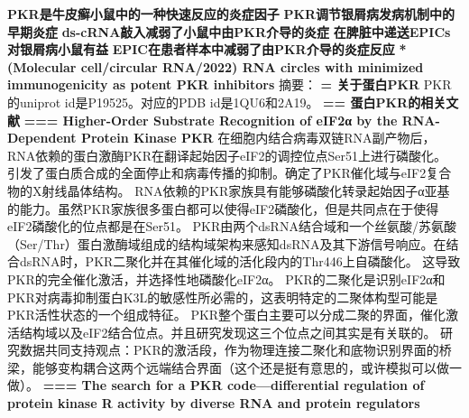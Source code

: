 \newline \textbf{PKR是牛皮癣小鼠中的一种快速反应的炎症因子}
\newline \indent 
\newline \textbf{PKR调节银屑病发病机制中的早期炎症}
\newline \indent
\newline \textbf{ds-cRNA敲入减弱了小鼠中由PKR介导的炎症}
\newline \indent
\newline \textbf{在脾脏中递送EPICs对银屑病小鼠有益}
\newline \indent
\newline \textbf{EPIC在患者样本中减弱了由PKR介导的炎症反应}
\newline \indent
\newline \textbf{* (Molecular cell/circular RNA/2022) RNA circles with minimized immunogenicity as potent PKR inhibitors}
\newline 摘要：
\newline \textbf{= 关于蛋白PKR}
\newline \indent PKR的uniprot id是P19525。对应的PDB id是1QU6和2A19。
\newline \textbf{== 蛋白PKR的相关文献}
\newline \textbf{=== Higher-Order Substrate Recognition of eIF2α by the RNA-Dependent Protein Kinase PKR}
\newline \indent 在细胞内结合病毒双链RNA副产物后，RNA依赖的蛋白激酶PKR在翻译起始因子eIF2的调控位点Ser51上进行磷酸化。
引发了蛋白质合成的全面停止和病毒传播的抑制。确定了PKR催化域与eIF2复合物的X射线晶体结构。
\newline \indent RNA依赖的PKR家族具有能够磷酸化转录起始因子α亚基的能力。虽然PKR家族很多蛋白都可以使得eIF2磷酸化，但是共同点在于使得eIF2磷酸化的位点都是在Ser51。
PKR由两个dsRNA结合域和一个丝氨酸/苏氨酸（Ser/Thr）蛋白激酶域组成的结构域架构来感知dsRNA及其下游信号响应。在结合dsRNA时，PKR二聚化并在其催化域的活化段内的Thr446上自磷酸化。
这导致PKR的完全催化激活，并选择性地磷酸化eIF2α。
\newline \indent PKR的二聚化是识别eIF2α和PKR对病毒抑制蛋白K3L的敏感性所必需的，这表明特定的二聚体构型可能是PKR活性状态的一个组成特征。
\newline \indent PKR整个蛋白主要可以分成二聚的界面，催化激活结构域以及eIF2结合位点。并且研究发现这三个位点之间其实是有关联的。
研究数据共同支持观点：PKR的激活段，作为物理连接二聚化和底物识别界面的桥梁，能够变构耦合这两个远端结合界面（这个还是挺有意思的，或许模拟可以做一做）。
\newline \textbf{=== The search for a PKR code—differential regulation of protein kinase R activity by diverse RNA and protein regulators}
